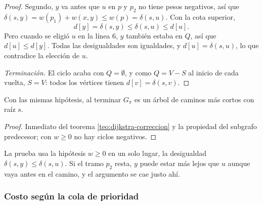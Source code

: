 \documentclass[11pt,letterpaper]{article}
\begin{document}
\begin{proof}
  Segundo, $y$ va antes que $u$ en $p$ y $p_2$ no tiene pesos
  negativos, así que $\delta(s, y) = w(p_1) + w(x, y) \le w(p) =
  \delta(s, u)$. Con la cota superior,
  \[
    d[y] = \delta(s, y) \le \delta(s, u) \le d[u] .
  \]
  Pero cuando se eligió $u$ en la línea 6, $y$ también estaba en $Q$,
  así que $d[u] \le d[y]$. Todas las desigualdades son igualdades, y
  $d[u] = \delta(s, u)$, lo que contradice la elección de $u$.

  \textit{Terminación.} El ciclo acaba con $Q = \emptyset$, y como
  $Q = V - S$ al inicio de cada vuelta, $S = V$: todos los vértices
  tienen $d[v] = \delta(s, v)$.
\end{proof}

\begin{corolario}\label{cor:dijkstra-arbol}
  Con las mismas hipótesis, al terminar $G_\pi$ es un árbol de caminos
  más cortos con raíz $s$.
\end{corolario}

\begin{proof}
  Inmediato del teorema \ref{teo:dijkstra-correccion} y la propiedad
  del subgrafo predecesor; con $w \ge 0$ no hay ciclos negativos.
\end{proof}

La prueba usa la hipótesis $w \ge 0$ en un solo lugar, la desigualdad
$\delta(s, y) \le \delta(s, u)$. Si el tramo $p_2$ resta, $y$ puede
estar más lejos que $u$ aunque vaya antes en el camino, y el
argumento se cae justo ahí.

\subsubsection*{Costo según la cola de prioridad}
\end{document}

